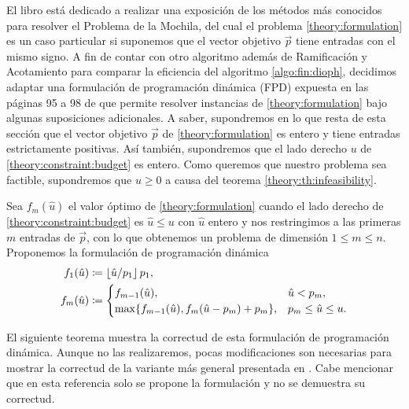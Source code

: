 \noindent
El libro \cite{martello} está dedicado a realizar una exposición de los métodos más conocidos para
resolver el Problema de la Mochila, del cual el problema \eqref{theory:formulation} es un caso
particular si suponemos que el vector objetivo $\vec{p}$ tiene entradas con el mismo
signo. A fin de contar con otro algoritmo además de Ramificación y Acotamiento para comparar la
eficiencia del algoritmo \ref{algo:fin:dioph}, decidimos adaptar una formulación de programación
dinámica (FPD) expuesta en las páginas 95 a 98 de \cite{martello} que permite resolver instancias de
\eqref{theory:formulation} bajo algunas suposiciones adicionales. A saber, supondremos en lo que
resta de esta sección que el vector objetivo $\vec{p}$ de \eqref{theory:formulation} es entero y
tiene entradas estrictamente positivas. Así también, supondremos que el lado derecho $u$ de
\eqref{theory:constraint:budget} es entero. Como queremos que nuestro problema sea factible,
supondremos que $u \geq 0$ a causa del teorema \ref{theory:th:infeasibility}.

Sea $f_m(\hat{u})$ el valor óptimo de \eqref{theory:formulation} cuando el lado derecho de
\eqref{theory:constraint:budget} es $\hat{u} \leq u$ con $\hat{u}$ entero y nos restringimos a las
primeras $m$ entradas de $\vec{p}$, con lo que obtenemos un problema de dimensión $1 \leq m \leq n$.
Proponemos la formulación de programación dinámica
\begin{subequations}
	\label{formulation:dp}
	\begin{align}
		f_1(\hat{u}) &\coloneq \left\lfloor \hat{u}/p_1 \right\rfloor p_1, \label{dp:base} \\
		f_m(\hat{u}) &\coloneq \begin{cases}
			f_{m-1}(\hat{u}), & \hat{u} < p_m, \\
			\max\lbrace f_{m - 1}(\hat{u}), f_{m}(\hat{u} - p_m) + p_m \rbrace, & p_m \leq \hat{u} \leq u.
			\label{dp:rec}
		\end{cases}
	\end{align}
\end{subequations}

El siguiente teorema muestra la correctud de esta formulación de programación dinámica. Aunque no
las realizaremos, pocas modificaciones son necesarias para mostrar la correctud de la variante más
general presentada en \cite{martello}. Cabe mencionar que en esta referencia solo se propone la
formulación y no se demuestra su correctud.

